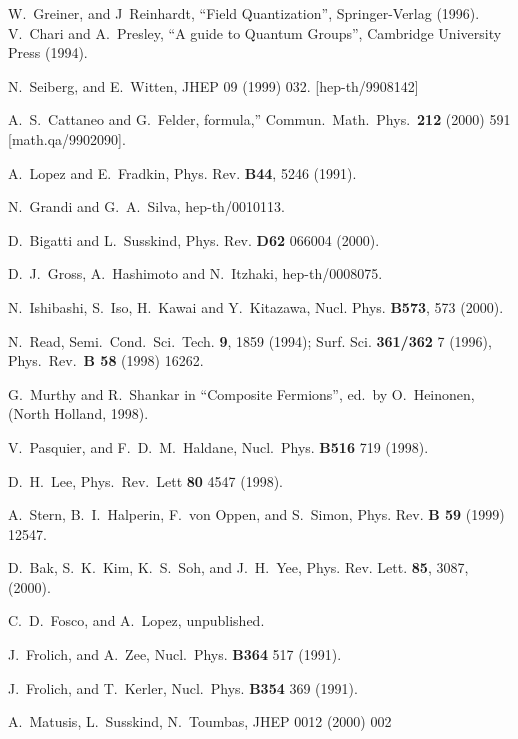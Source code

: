 \documentclass[a4paper,12pt]{article}
\begin{document}
\begin{thebibliography}{bib}
W.~Greiner, and J~Reinhardt, ``Field
Quantization'',
  Springer-Verlag (1996).   V.~Chari and A.~Presley,
``A
  guide to Quantum Groups'', Cambridge University Press (1994).
  
N.~Seiberg, and E.~Witten, JHEP 09 (1999) 032.
  [hep-th/9908142]
     
A.~S.~Cattaneo and G.~Felder,
formula,''
  Commun.\ Math.\ Phys.\ {\bf 212} (2000) 591 [math.qa/9902090].
  
A.~Lopez and E.~Fradkin, Phys. Rev. {\bf B44}, 5246
  (1991).
  
N.~Grandi and G.~A.~Silva, hep-th/0010113.
  
D.~Bigatti and L.~Susskind, Phys. Rev. {\bf D62} 066004
  (2000).
  
D.~J.~Gross, A.~Hashimoto and N.~Itzhaki,
hep-th/0008075.
  
N.~Ishibashi, S.~Iso, H.~Kawai and Y.~Kitazawa, Nucl.
  Phys. {\bf B573}, 573 (2000).
  
N.~Read, Semi.~Cond.~Sci.~Tech. {\bf 9}, 1859 (1994);
  Surf. Sci. {\bf 361/362} 7 (1996), Phys.~Rev.~{\bf B 58} (1998)
  16262.
  
G.~Murthy and R.~Shankar in ``Composite Fermions'',
ed.\ 
  by O.~Heinonen, (North Holland, 1998).
  
V.~Pasquier, and F.~D.~M.~Haldane, Nucl.~Phys.  {\bf
B516}
  719 (1998).
  
D.~H.~Lee, Phys.~Rev.~Lett {\bf 80} 4547 (1998).
  
A.~Stern, B.~I.~Halperin, F.~von Oppen, and S.~Simon,
  Phys. Rev. {\bf B 59} (1999) 12547.
  
D.~Bak, S.~K.~Kim, K.~S.~Soh, and J.~H.~Yee, Phys. Rev.
  Lett. {\bf 85}, 3087, (2000).
  
C.~D.~Fosco, and A.~Lopez, unpublished.
  
J.~Frolich, and A.~Zee, Nucl.~Phys. {\bf B364} 517
(1991).
  
J.~Frolich, and T.~Kerler, Nucl.~Phys. {\bf B354} 369
  (1991).
  
A.~Matusis, L.~Susskind, N.~Toumbas, JHEP 0012 (2000)
002
  

\end{thebibliography}
\end{document}

